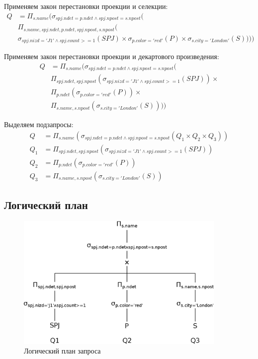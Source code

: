 \documentclass[russian,utf8,emptystyle]{eskdtext}
\begin{document}
Применяем закон перестановки проекции и селекции:
\begin{align*}
Q &= \Pi_{s.name}(\sigma_{spj.ndet = p.ndet \wedge spj.npost = s.npost}( \\
  & \Pi_{s.name, spj.ndet, p.ndet, spj.npost, s.npost}( \\
  & \sigma_{spj.nizd='J1' \wedge spj.count>=1}(SPJ) \times \sigma_{p.color='red'}(P) \times \sigma_{s.city='London'}(S))))
\end{align*}

Применяем закон перестановки проекции и декартового произведения:
\begin{align*}
Q &= \Pi_{s.name}(\sigma_{spj.ndet = p.ndet \wedge spj.npost = s.npost}( \\
  & \Pi_{spj.ndet,spj.npost}(\sigma_{spj.nizd='J1' \wedge spj.count>=1}(SPJ)) \times \\
  & \Pi_{p.ndet}(\sigma_{p.color='red'}(P)) \times \\ 
  & \Pi_{s.name,s.npost}(\sigma_{s.city='London'}(S)) ))
\end{align*}

Выделяем подзапросы:
\begin{align*}
Q   &= \Pi_{s.name}(\sigma_{spj.ndet = p.ndet \wedge spj.npost = s.npost}( Q_1 \times Q_2 \times  Q_3 )) \\
Q_1 &= \Pi_{spj.ndet,spj.npost}(\sigma_{spj.nizd='J1' \wedge spj.count>=1}(SPJ)) \\
Q_2 &= \Pi_{p.ndet}(\sigma_{p.color='red'}(P)) \\
Q_3 &= \Pi_{s.name,s.npost}(\sigma_{s.city='London'}(S))
\end{align*}

\clearpage
\subsection{Логический план}
\begin{figure}[h!]
\includegraphics[width=0.9\textwidth]{logic_plan}
\caption{Логический план запроса}
\label{fit:logic_plan}
\end{figure}
\end{document}
